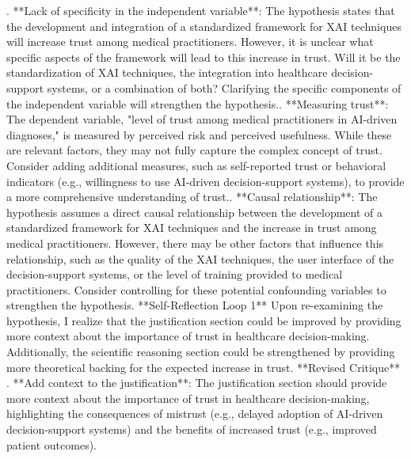 \documentclass{article}%
\begin{document}
. **Lack of specificity in the independent variable**: The hypothesis states that the development and integration of a standardized framework for XAI techniques will increase trust among medical practitioners. However, it is unclear what specific aspects of the framework will lead to this increase in trust. Will it be the standardization of XAI techniques, the integration into healthcare decision{-}support systems, or a combination of both? Clarifying the specific components of the independent variable will strengthen the hypothesis.. **Measuring trust**: The dependent variable, "level of trust among medical practitioners in AI{-}driven diagnoses," is measured by perceived risk and perceived usefulness. While these are relevant factors, they may not fully capture the complex concept of trust. Consider adding additional measures, such as self{-}reported trust or behavioral indicators (e.g., willingness to use AI{-}driven decision{-}support systems), to provide a more comprehensive understanding of trust.. **Causal relationship**: The hypothesis assumes a direct causal relationship between the development of a standardized framework for XAI techniques and the increase in trust among medical practitioners. However, there may be other factors that influence this relationship, such as the quality of the XAI techniques, the user interface of the decision{-}support systems, or the level of training provided to medical practitioners. Consider controlling for these potential confounding variables to strengthen the hypothesis.\newline%
\newline%
**Self{-}Reflection Loop 1**\newline%
\newline%
Upon re{-}examining the hypothesis, I realize that the justification section could be improved by providing more context about the importance of trust in healthcare decision{-}making. Additionally, the scientific reasoning section could be strengthened by providing more theoretical backing for the expected increase in trust.\newline%
\newline%
**Revised Critique**\newline%
. **Add context to the justification**: The justification section should provide more context about the importance of trust in healthcare decision{-}making, highlighting the consequences of mistrust (e.g., delayed adoption of AI{-}driven decision{-}support systems) and the benefits of increased trust (e.g., improved patient outcomes).\newline%
\end{document}
